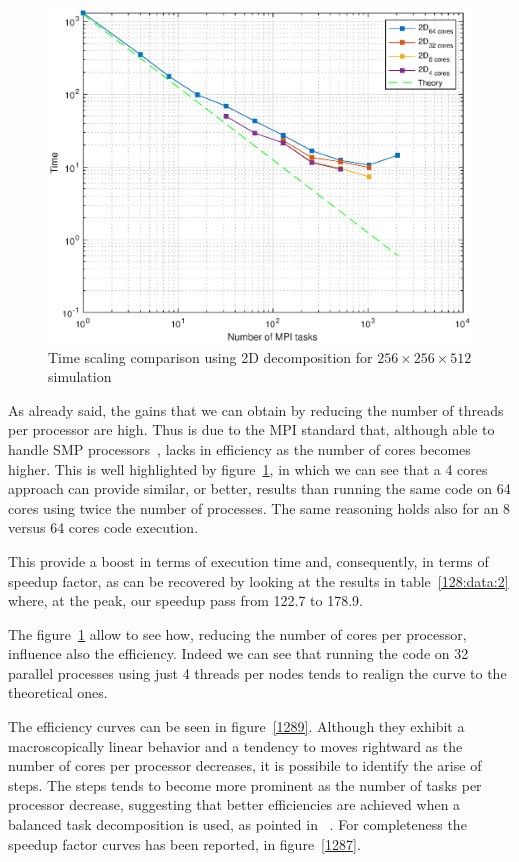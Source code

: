 \begin{figure}
\begin{center}
\includegraphics[scale=0.55]{grafici/1285}
\caption{Time scaling comparison using 2D decomposition for $256\times 256\times 512$  simulation}
\label{1285}
\end{center}
\end{figure}

As already said, the gains that we can obtain by reducing the number of threads per processor are high. 
Thus is due to the MPI standard that, although able to handle SMP processors~\cite{smp:processors}, lacks in efficiency as the number of cores becomes higher.
This is well highlighted by figure~\ref{1285}, in which we can see that a 4 cores approach can provide similar, or better, results than running the same code on 64 cores using twice the number of processes. The same reasoning holds also for an 8 versus 64 cores code execution. \par
This provide a boost in terms of execution time and, consequently, in terms of speedup factor, as can be recovered by looking at the results in table~\ref{128:data:2} where, at the peak, our speedup pass from 122.7 to 178.9.\par
The figure~\ref{1285} allow to see how, reducing the number of cores per processor, influence also the efficiency. Indeed we can see that running the code on 32 parallel processes using just 4 threads per nodes tends to realign the curve to the theoretical ones.\par
The efficiency curves can be seen in figure~\ref{1289}. Although they exhibit a macroscopically linear behavior and a tendency to moves rightward as the number of cores per processor decreases, it is possibile to identify the arise of steps. The steps tends to become more prominent as the number of tasks per processor decrease, suggesting that better efficiencies are achieved when a balanced task decomposition is used, as pointed in~\cite{tesi:brach} . 
For completeness the speedup factor curves has been reported, in figure~\ref{1287}.

